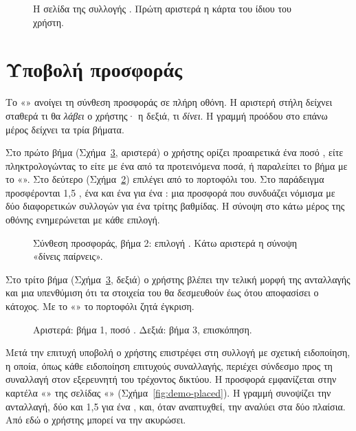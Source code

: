 \begin{figure}[H]
\centering
{}
\caption{Η σελίδα της συλλογής . Πρώτη αριστερά η κάρτα  του ίδιου του
χρήστη.}
\label{fig:demo-collection}
\end{figure}

\section{Υποβολή προσφοράς}
\label{sec:demo-bid}

Το «» ανοίγει τη σύνθεση προσφοράς σε πλήρη οθόνη. Η αριστερή στήλη δείχνει
σταθερά τι θα \emph{λάβει} ο χρήστης· η δεξιά, τι \emph{δίνει}. Η γραμμή προόδου στο επάνω
μέρος δείχνει τα τρία βήματα.

Στο πρώτο βήμα (Σχήμα~\ref{fig:demo-bid-13}, αριστερά) ο χρήστης ορίζει προαιρετικά ένα
ποσό , είτε πληκτρολογώντας το είτε με ένα από τα προτεινόμενα ποσά, ή παραλείπει
το βήμα με το «». Στο δεύτερο (Σχήμα~\ref{fig:demo-bid-2}) επιλέγει  από το πορτοφόλι
του. Στο παράδειγμα προσφέρονται 1{,}5 , ένα  και ένα
 για ένα : μια προσφορά που συνδυάζει νόμισμα με
 δύο διαφορετικών συλλογών για ένα  τρίτης βαθμίδας. Η σύνοψη στο κάτω
μέρος της οθόνης ενημερώνεται με κάθε επιλογή.

\begin{figure}[H]
\centering
{}
\caption{Σύνθεση προσφοράς, βήμα 2: επιλογή . Κάτω αριστερά η σύνοψη
«δίνεις \swap{} παίρνεις».}
\label{fig:demo-bid-2}
\end{figure}

Στο τρίτο βήμα (Σχήμα~\ref{fig:demo-bid-13}, δεξιά) ο χρήστης βλέπει την τελική μορφή της
ανταλλαγής και μια υπενθύμιση ότι τα στοιχεία του θα δεσμευθούν έως ότου αποφασίσει ο
κάτοχος. Με το «» το πορτοφόλι ζητά έγκριση.

\begin{figure}[H]
\centering
{}
\caption{Αριστερά: βήμα 1, ποσό . Δεξιά: βήμα 3, επισκόπηση.}
\label{fig:demo-bid-13}
\end{figure}

Μετά την επιτυχή υποβολή ο χρήστης επιστρέφει στη συλλογή με σχετική ειδοποίηση, η
οποία, όπως κάθε ειδοποίηση επιτυχούς συναλλαγής, περιέχει σύνδεσμο προς τη συναλλαγή στον
εξερευνητή του τρέχοντος δικτύου. Η
προσφορά εμφανίζεται στην καρτέλα «» της σελίδας «»
(Σχήμα~\ref{fig:demo-placed}). Η γραμμή συνοψίζει την ανταλλαγή, δύο  και 1{,}5  για ένα , και,
όταν αναπτυχθεί, την αναλύει στα δύο πλαίσια. Από εδώ ο
χρήστης μπορεί να την ακυρώσει.

